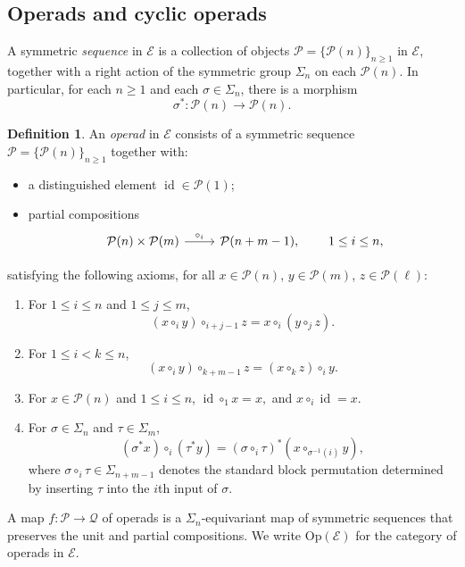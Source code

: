 \documentclass{amsart}
\newcommand{\bE}{\mathscr{E}}
\newcommand{\calQ}{\mathcal{Q}}
\newcommand{\calP}{\mathcal{P}}
\newcommand{\Op}{\mathrm{Op}}
\newcommand{\id}{\operatorname{id}}
\theoremstyle{definition}
\newtheorem{definition}[theorem]{Definition}%
\numberwithin{equation}{section}
\begin{document}
\subsection{Operads and cyclic operads}
A symmetric \emph{sequence} in $\bE$ is a collection of objects $\calP=\{\calP(n)\}_{n\ge 1}$ in $\bE$, together with a right action of the symmetric group $\Sigma_n$ on each $\calP(n)$. In particular, for each $n\ge 1$ and each $\sigma\in\Sigma_n$, there is a morphism
\[
\sigma^*:\calP(n)\to \calP(n).
\]

\begin{definition}\label{def:operad}
An \emph{operad} in $\bE$ consists of a symmetric sequence $\calP=\{\calP(n)\}_{n\ge 1}$ together with:
\begin{itemize}
\item a distinguished element $\id\in\calP(1)$;
\item partial compositions
\[
\begin{tikzcd}
\calP(n)\times \calP(m)\arrow[r,"\circ_i"]& \calP(n+m-1),
\end{tikzcd}
\qquad 1\le i\le n,
\]
\end{itemize}
satisfying the following axioms, for all $x\in\calP(n)$, $y\in\calP(m)$, $z\in\calP(\ell)$:

\begin{enumerate}
\item For $1\le i\le n$ and $1\le j\le m$,
\[
(x\circ_i y)\circ_{i+j-1} z = x\circ_i (y\circ_j z).
\]

\item For $1\le i<k\le n$,
\[
(x\circ_i y)\circ_{k+m-1} z = (x\circ_k z)\circ_i y.
\]

\item For $x\in\calP(n)$ and $1\le i\le n$, $\id\circ_1 x = x,$ and $x\circ_i \id = x.$ 

\item  For $\sigma\in\Sigma_n$ and $\tau\in\Sigma_m$,
\[
(\sigma^*x)\circ_i (\tau^*y) =
(\sigma\circ_i \tau)^*(x\circ_{\sigma^{-1}(i)} y),
\]
where $\sigma\circ_i\tau\in\Sigma_{n+m-1}$ denotes the standard block permutation determined by
inserting $\tau$ into the $i$th input of $\sigma$.
\end{enumerate}
\end{definition}


A map $f:\calP\to\calQ$ of operads is a $\Sigma_n$-equivariant map of symmetric sequences that preserves the unit and partial compositions. We write $\Op(\bE)$ for the category of operads in $\bE$.
\end{document}
